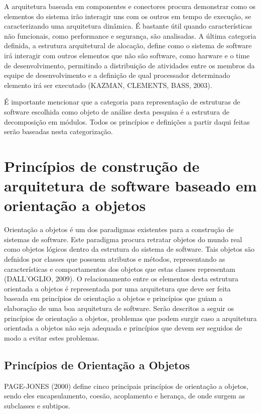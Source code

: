 A arquitetura baseada em componentes e conectores procura demonstrar como os elementos do sistema irão interagir uns com os outros em tempo de execução, se caracterizando uma arquitetura dinâmica. É bastante útil quando características não funcionais, como performance e segurança, são analisadas.  A última categoria definida, a estrutura arquitetural de alocação, define como o sistema de software irá interagir com outros elementos que não são software, como harware e o time de desenvolvimento, permitindo a distribuição de atividades entre os membros da equipe de desenvolvimento e a definição de qual processador determinado elemento irá ser executado (KAZMAN, CLEMENTS, BASS, 2003).

É importante mencionar que a categoria para representação de estruturas de software escolhida como objeto de análise desta pesquisa é a estrutura de decomposição em módulos. Todos os princípios e definições a partir daqui feitas serão baseadas nesta categorização.

\section{Princípios de construção de arquitetura de software baseado em orientação a objetos}
Orientação a objetos é um dos paradigmas existentes para a construção de sistemas de software. Este paradigma procura retratar objetos do mundo real como objetos lógicos dentro da estrutura do sistema de software. Tais objetos são defnidos por classes que possuem atributos e métodos, representando as características e comportamentos dos objetos que estas classes representam (DALL’OGLIO, 2009). O relacionamento entre os elementos desta estrutura orientada a objetos é representada por uma arquitetura que deve ser feita baseada em princípios de orientação a objetos e princípios que guiam a elaboração de uma boa arquitetura de software. Serão descritos a seguir os princípios de orientação a objetos, problemas que podem surgir caso a arquitetura orientada a objetos não seja adequada e princípios que devem ser seguidos de modo a evitar estes problemas.

\subsection{Princípios de Orientação a Objetos}
PAGE-JONES (2000) define cinco principais princípios de orientação a objetos, sendo eles encapsulamento, coesão, acoplamento e herança, de onde surgem as subclasses e subtipos.

